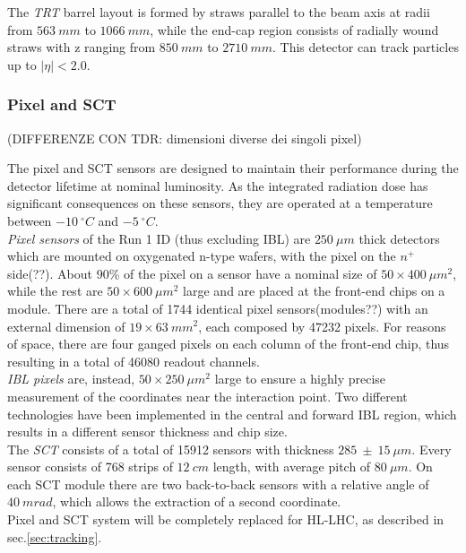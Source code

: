 \documentclass[a4paper,twoside,12pt]{article}
\begin{document}
The \textit{TRT} barrel layout is formed by straws parallel to the beam axis at radii from $563\ mm$ to $1066\ mm$,
while the end-cap region consists of radially wound straws with z ranging from $850\ mm$ to 
$2710\ mm$. This detector can track particles up to $|\eta| < 2.0$.

\subsubsection*{Pixel and SCT} (DIFFERENZE CON TDR: dimensioni diverse dei singoli pixel)

The pixel and SCT sensors are designed to maintain their performance during the detector
lifetime at nominal luminosity\cite{Aad:2008zzm}. As the integrated radiation dose has significant consequences
on these sensors, they are operated at a temperature between $-10\ ^{\circ}C$ and $-5\ ^{\circ}C$.\\

\textit{Pixel sensors} of the Run 1 ID (thus excluding IBL) are $250\ \mu m$ thick detectors which are mounted on oxygenated n-type wafers, with the pixel on the $n^+$ side(??). About 90\% of the pixel on a sensor have a nominal 
size of $50 \times 400\ \mu m^2$, while the rest are $50 \times 600\ \mu m^2$ large and are placed
at the front-end chips on a module. There are a total of 1744 identical pixel sensors(modules??) with an external dimension of $19 \times 63\ mm^2$, each composed by 47232 pixels. For reasons of space, there are four ganged pixels on each column of the front-end chip, thus resulting in a total of 46080 readout channels. \\

\textit{IBL pixels} are, instead, $50 \times 250\ \mu m^2$ large to 
ensure a highly precise measurement of the coordinates near the interaction point\cite{IBL}. Two 
different technologies have been implemented in the central and forward IBL region, which
results in a different sensor thickness and chip size.\\

The \textit{SCT} consists of a total of 15912 sensors with thickness $285\ \pm\ 15\ \mu m$. Every sensor consists of 768 strips of $12\ cm$ length, with average pitch of $80\ \mu m$.
On each SCT module there are two back-to-back sensors with a relative angle of $40\ mrad$,
which allows the extraction of a second coordinate.\\

Pixel and SCT system will be completely replaced for HL-LHC, as described in sec.\ref{sec:tracking}.
\end{document}
